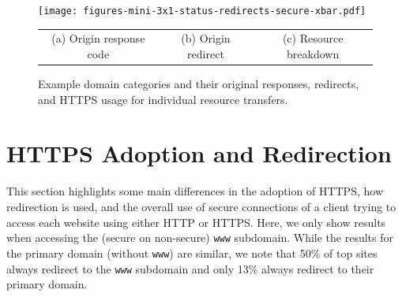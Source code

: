 \documentclass[letterpaper]{sig-alternate-10pt}
\begin{document}

\begin{figure}[t]
\centering
\texttt{[image: figures-mini-3x1-status-redirects-secure-xbar.pdf]}
\begin{tabular}{ccc}
(a) Origin response code &
(b) Origin redirect &
(c) Resource breakdown \\
\end{tabular}
\vspace{-12pt}
\caption{Example domain categories and their original responses, 
redirects, and HTTPS usage for individual resource transfers.}
\label{fig:httpsDiff}
\vspace{-12pt}
\end{figure}

\section{HTTPS Adoption and Redirection}\label{sec:https}

This section highlights some main differences in the adoption of HTTPS, 
how redirection is used, and the overall use of secure connections of 
a client trying to access each website using either HTTP or HTTPS.
Here, we only show results when accessing the (secure on non-secure) \texttt{www} subdomain.
While the results for the primary domain (without \texttt{www}) are similar,
we note that 50\% of top sites always redirect to the \texttt{www} subdomain
and only 13\% always redirect to their primary domain.
\end{document}
